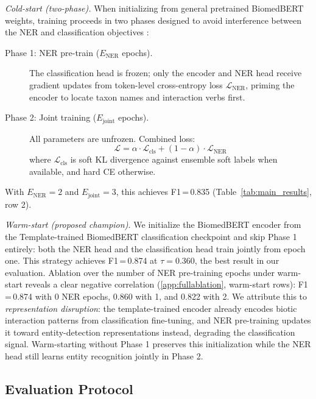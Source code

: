 \documentclass[a4paper,fleqn]{cas-sc}
\begin{document}
\emph{Cold-start (two-phase).}
When initializing from general pretrained BiomedBERT weights, training
proceeds in two phases designed to avoid interference between the NER and
classification objectives \citep{liu2019multi}:
\begin{description}
    \item[Phase 1: NER pre-train ($E_\text{NER}$ epochs).]
    The classification head is frozen; only the encoder and NER head receive
    gradient updates from token-level cross-entropy loss $\mathcal{L}_\text{NER}$,
    priming the encoder to locate taxon names and interaction verbs first.

    \item[Phase 2: Joint training ($E_\text{joint}$ epochs).]
    All parameters are unfrozen. Combined loss:
    \[
        \mathcal{L} = \alpha \cdot \mathcal{L}_\text{cls} +
                      (1{-}\alpha) \cdot \mathcal{L}_\text{NER}
    \]
    where $\mathcal{L}_\text{cls}$ is soft KL divergence against ensemble
    soft labels when available, and hard CE otherwise.
\end{description}
With $E_\text{NER}{=}2$ and $E_\text{joint}{=}3$, this achieves
F1\,=\,0.835 (Table~\ref{tab:main_results}, row 2).

\emph{Warm-start (proposed champion).}
We initialize the BiomedBERT encoder from the Template-trained
BiomedBERT classification checkpoint and skip Phase 1 entirely: both the NER head and
the classification head train jointly from epoch one.
This strategy achieves F1\,=\,0.874 at $\tau{=}0.360$, the best result in our evaluation.
Ablation over the number of NER pre-training epochs under warm-start
reveals a clear negative correlation (\ref{app:fullablation},
warm-start rows): F1\,=\,0.874 with 0 NER epochs, 0.860 with 1, and
0.822 with 2.
We attribute this to \emph{representation disruption}: the template-trained
encoder already encodes biotic interaction patterns from classification
fine-tuning, and NER pre-training updates it toward entity-detection
representations instead, degrading the classification signal.
Warm-starting without Phase 1 preserves this initialization while the
NER head still learns entity recognition jointly in Phase 2.

\subsection{Evaluation Protocol}
\label{sec:eval}
\end{document}
